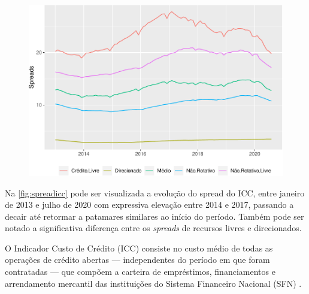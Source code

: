 \documentclass[12pt,openright,oneside,a4paper,chapter=TITLE,section=TITLE,subsection=Title,english,french,spanish,portugues,sumario=tradicional]{04-class-files/abntex2}
\begin{document}
\begin{figure}

\begin{center}\includegraphics{12-exportedfigures/spread 2019 icc-1} \end{center}
\label{fig:spreadicc}
\end{figure}

Na \autoref{fig:spreadicc} pode ser visualizada a evolução do spread do ICC, entre janeiro de 2013 e julho de 2020 com expressiva elevação entre 2014 e 2017, passando a decair até retormar a patamares similares ao início do período. Também pode ser notado a significativa diferença entre os \emph{spreads} de recursos livres e direcionados.

O Indicador Custo de Crédito (ICC) consiste no custo médio de todas as
operações de crédito abertas --- independentes do período em que foram contratadas
--- que compõem a carteira de empréstimos, financiamentos e arrendamento
mercantil das instituições do Sistema Financeiro Nacional (SFN) \cite{BCB:2000}.
\end{document}
